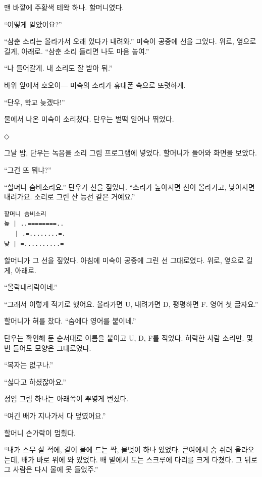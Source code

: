 \documentclass[
  korean,
  letterpaper,
  twoside,
  open=any,
  fontsize=12.5pt,
  headings=small]{scrbook}
\newcommand{\logfont}{\linespread{1}\fontsize{10.8}{15.2}\selectfont}
\begin{document}
맨 바깥에 주황색 테왁 하나.
할머니였다.

``어떻게 알았어요?''

``삼춘 소리는 올라가서 오래
있다가 내려와.'' 미숙이 공중에
선을 그었다. 위로, 옆으로
길게, 아래로. ``삼춘 소리
들리면 나도 마음 놓여.''

``나 들어갈게. 내 소리도 잘
받아 둬.''

바위 앞에서 호오이--- 미숙의
소리가 휴대폰 속으로 또렷하게.

``단우, 학교 늦겠다!''

물에서 나온 미숙이 소리쳤다.
단우는 벌떡 일어나 뛰었다.

\begin{center}◇\end{center}\nopagebreak

그날 밤, 단우는 녹음을 소리
그림 프로그램에 넣었다.
할머니가 들어와 화면을 보았다.

``그건 또 뭐냐?''

``할머니 숨비소리요.'' 단우가
선을 짚었다. ``소리가 높아지면
선이 올라가고, 낮아지면
내려가요. 소리로 그린 산 능선
같은 거예요.''

\begin{Verbatim}[samepage=true,frame=single,framesep=2.5mm,rulecolor=\color{gray},formatcom=\logfont]
할머니 숨비소리
높 | ..========..
   | .=........=.
낮 | =..........=
\end{Verbatim}

할머니가 그 선을 짚었다.
아침에 미숙이 공중에 그린 선
그대로였다. 위로, 옆으로 길게,
아래로.

``올락내리락이네.''

``그래서 이렇게 적기로 했어요.
올라가면 U, 내려가면 D,
평평하면 F. 영어 첫 글자요.''

할머니가 혀를 찼다. ``숨에다
영어를 붙이네.''

단우는 확인해 둔 순서대로
이름을 붙이고 U, D, F를
적었다. 허락한 사람 소리만. 몇
번 들어도 모양은 그대로였다.

``복자는 없구나.''

``싫다고 하셨잖아요.''

정임 그림 하나는 아래쪽이
뿌옇게 번졌다.

``여긴 배가 지나가서 다
덮였어요.''

할머니 손가락이 멈췄다.

``내가 스무 살 적에, 같이 물에
드는 짝, 물벗이 하나 있었다.
큰여에서 숨 쉬러 올라오는데,
배가 바로 위에 와 있었다. 배
밑에서 도는 스크루에 다리를
크게 다쳤다. 그 뒤로 그 사람은
다시 물에 못 들었주.''
\end{document}
